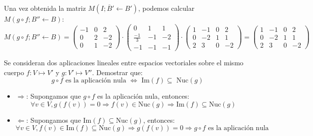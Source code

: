 \begin{ejercicio}
\begin{equation*}
	\end{equation*}
	Una vez obtenida la matriz $M(I;\overline{B}'\leftarrow B')$, podemos calcular $M(g \circ f;B'' \leftarrow B)$:
	\begin{equation*}
		M(g \circ f;B'' \leftarrow B) = \begin{pmatrix}
			-1 & 0 & 2  \\
			0  & 2 & -2 \\
			0  & 1 & -2
		\end{pmatrix} \cdot \begin{pmatrix}
			0            & 1  & 1  \\
			\frac{-1}{3} & -1 & -2 \\
			-1           & -1 & -1
		\end{pmatrix} \cdot \begin{pmatrix}
			1 & -1 & 0 & 2  \\
			0 & -2 & 1 & 1  \\
			2 & 3  & 0 & -2
		\end{pmatrix} = \begin{pmatrix}
			1 & -1 & 0 & 2  \\
			0 & -2 & 1 & 1  \\
			2 & 3  & 0 & -2
		\end{pmatrix}
	\end{equation*}
\end{ejercicio}


\begin{ejercicio}
	Se consideran dos aplicaciones lineales entre espacios vectoriales sobre el mismo cuerpo $f : V \mapsto V'$ y $g : V' \mapsto V''$. Demostrar que:
	\begin{equation*}
		g \circ f \text{ es la aplicación nula } \Leftrightarrow \text{ Im}(f) \subseteq \text{ Nuc}(g)
	\end{equation*}
	\begin{itemize}
		\item $\Rightarrow$: Supongamos que $g \circ f$ es la aplicación nula, entonces:
		      \begin{equation*}
			      \forall v \in V, g(f(v)) = 0 \Rightarrow f(v) \in \text{Nuc}(g) \Rightarrow \text{Im}(f) \subseteq \text{Nuc}(g)
		      \end{equation*}
		\item $\Leftarrow$: Supongamos que $\text{Im}(f) \subseteq \text{Nuc}(g)$, entonces:
		      \begin{equation*}
			      \forall v \in V, f(v) \in \text{Im}(f) \subseteq \text{Nuc}(g) \Rightarrow g(f(v)) = 0 \Rightarrow g \circ f \text{ es la aplicación nula}
		      \end{equation*}
	\end{itemize}
\end{ejercicio}


